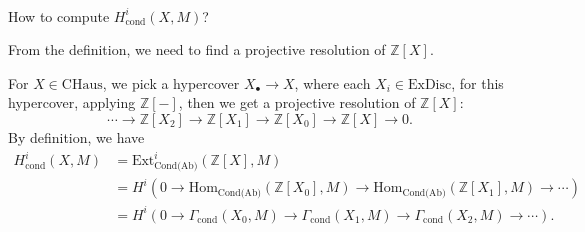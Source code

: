 \documentclass[UTF8,12,a4paper]{ctexart}
\theoremstyle{definition}
\begin{document}
~\\
\Q
How to compute $H^i_{\text{cond}}(X,M)$?

From the definition, we need to find a projective resolution of $\mathbb{Z}\left[X\right]$.

For $X\in\text{CHaus}$, we pick a hypercover $X_{\bullet}\to X$, where each $X_i\in \text{ExDisc}$, for this hypercover, applying $\mathbb{Z}\left[-\right]$, then we get a projective resolution of $\mathbb{Z}\left[X\right]$:
$$
\cdots\longrightarrow\mathbb{Z}\left[X_2\right]\longrightarrow\mathbb{Z}\left[X_1\right]\longrightarrow\mathbb{Z}\left[X_0\right]\longrightarrow\mathbb{Z}\left[X\right]\longrightarrow 0.
$$
By definition, we have
\begin{align*}
H^i_{\text{cond}}(X,M)&=\text{Ext}^i_{\text{Cond(Ab)}}(\mathbb{Z}\left[X\right],M)\\
&=H^i(0\rightarrow\text{Hom}_{\text{Cond(Ab)}}(\mathbb{Z}\left[X_0\right],M)\rightarrow\text{Hom}_{\text{Cond(Ab)}}(\mathbb{Z}\left[X_1\right],M)\rightarrow\cdots)\\
&=H^i(0\rightarrow\Gamma_{\text{cond}}(X_0,M)\rightarrow\Gamma_{\text{cond}}(X_1,M)\rightarrow\Gamma_{\text{cond}}(X_2,M)\rightarrow\cdots).
\end{align*}
\end{document}
